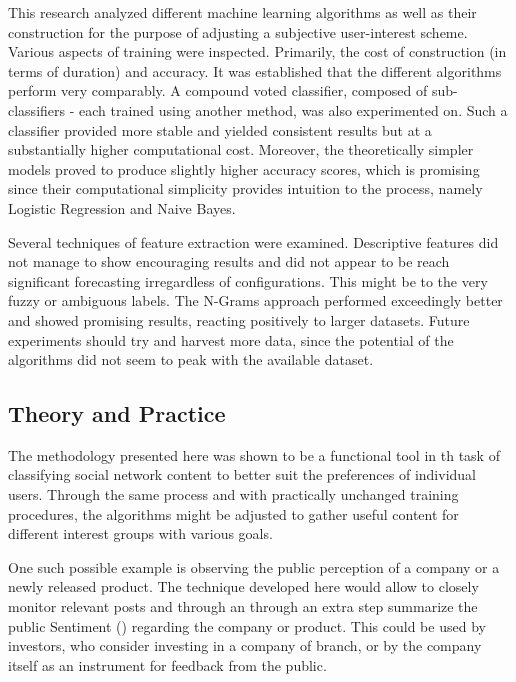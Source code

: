 	\par
	
	This research analyzed different machine learning algorithms as well as their construction for the purpose of adjusting a subjective user-interest scheme. Various aspects of training were inspected. Primarily, the cost of construction (in terms of duration) and accuracy. It was established that the different algorithms perform very comparably. A compound voted classifier, composed of sub-classifiers - each trained using another method, was also experimented on. Such a classifier provided more stable and yielded consistent results but at a substantially higher computational cost. Moreover, the theoretically simpler models proved to produce slightly higher accuracy scores, which is promising since their computational simplicity provides intuition to the process, namely Logistic Regression and Naive Bayes. 
	
	\par
	
	Several techniques of feature extraction were examined. Descriptive features did not manage to show encouraging results and did not appear to be reach significant forecasting irregardless of configurations. This might be to the very fuzzy or ambiguous labels. The N-Grams approach performed exceedingly better and showed promising results, reacting positively to larger datasets. Future experiments should try and harvest more data, since the potential of the algorithms did not seem to peak with the available dataset.
	
	\subsection{Theory and Practice}
		The methodology presented here was shown to be a functional tool in th task of classifying social network content to better suit the preferences of individual users. Through the same process and with practically unchanged training procedures, the algorithms might be adjusted to gather useful content for different interest groups with various goals.
		
		\par 
		
		One such possible example is observing the public perception of a company or a newly released product. The technique developed here would allow to closely monitor relevant posts and through an through an extra step summarize the public Sentiment (\cite{go2009twitter}) regarding the company or product. This could be used by investors, who consider investing in a company of branch, or by the company itself as an instrument for feedback from the public.
	
